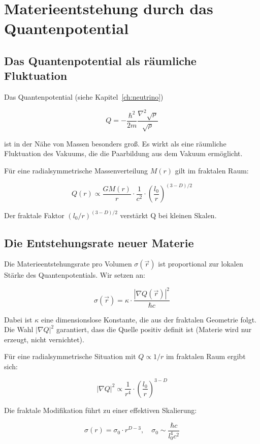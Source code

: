 \section{Materieentstehung durch das Quantenpotential}
\label{app:materieentstehung_quantenpotential}

\subsection{Das Quantenpotential als räumliche Fluktuation}
\label{sub:materieentstehung_q_fluktuation}

Das Quantenpotential (siehe Kapitel~\ref{ch:neutrino})

\[
Q = -\frac{\hbar^2}{2m} \frac{\nabla^2 \sqrt{\rho}}{\sqrt{\rho}}
\]

ist in der Nähe von Massen besonders groß. Es wirkt als eine räumliche Fluktuation
des Vakuums, die die Paarbildung aus dem Vakuum ermöglicht.

Für eine radialsymmetrische Massenverteilung \( M(r) \) gilt im fraktalen Raum:

\[
Q(r) \propto \frac{GM(r)}{r} \cdot \frac{1}{c^2} \cdot \left( \frac{l_0}{r} \right)^{(3-D)/2}
\]

Der fraktale Faktor \( (l_0/r)^{(3-D)/2} \) verstärkt Q bei kleinen Skalen.

\subsection{Die Entstehungsrate neuer Materie}
\label{sub:materieentstehung_rate}

Die Materieentstehungsrate pro Volumen \( \sigma(\vec{r}) \) ist proportional zur
lokalen Stärke des Quantenpotentials. Wir setzen an:

\[
\sigma(\vec{r}) = \kappa \cdot \frac{|\nabla Q(\vec{r})|^2}{\hbar c}
\]

Dabei ist \( \kappa \) eine dimensionslose Konstante, die aus der fraktalen Geometrie
folgt. Die Wahl \( |\nabla Q|^2 \) garantiert, dass die Quelle positiv definit ist
(Materie wird nur erzeugt, nicht vernichtet).

Für eine radialsymmetrische Situation mit \( Q \propto 1/r \) im fraktalen Raum
ergibt sich:

\[
|\nabla Q|^2 \propto \frac{1}{r^4} \cdot \left( \frac{l_0}{r} \right)^{3-D}
\]

Die fraktale Modifikation führt zu einer effektiven Skalierung:

\[
\boxed{\sigma(r) = \sigma_0 \cdot r^{D-3}}, \quad \sigma_0 \sim \frac{\hbar c}{l_0^4 c^2}
\]

